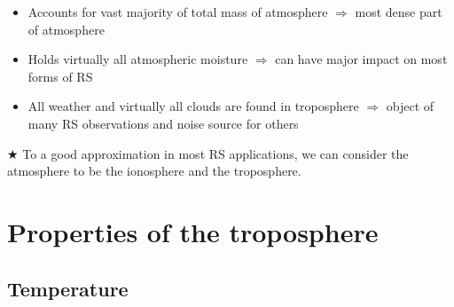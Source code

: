 \documentclass[11pt, oneside]{article}
\begin{document}
\begin{itemize}
\begin{itemize}
\begin{itemize}
			\item[--] Accounts for vast majority of total mass of atmosphere $\Rightarrow$ most dense part of atmosphere
			\item[--] Holds virtually all atmospheric moisture $\Rightarrow$ can have major impact on most forms of RS
			\item[--] All weather and virtually all clouds are found in troposphere $\Rightarrow$ object of many RS observations and noise source for others
		\end{itemize}
	\end{itemize}
\end{itemize}

\noindent$\bigstar$ To a good approximation in most RS applications, we can consider the atmosphere to be the ionosphere and the troposphere.

\section{Properties of the troposphere}
\label{s:tropo}

\subsection{Temperature}
\label{s:temp}
\end{document}
